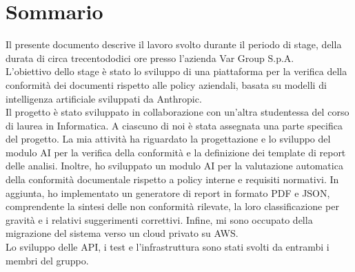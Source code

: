 \cleardoublepage
{}
{}
\begingroup
\let\clearpage\relax
\let\cleardoublepage\relax
\let\cleardoublepage\relax

\chapter*{Sommario}

Il presente documento descrive il lavoro svolto durante il periodo di stage, della durata di circa trecentododici ore presso l'azienda Var Group S.p.A. \\
L'obiettivo dello stage è stato lo sviluppo di una piattaforma per la verifica della conformità dei documenti rispetto alle policy aziendali, basata su modelli di intelligenza artificiale sviluppati da Anthropic.\\
Il progetto è stato sviluppato in collaborazione con un'altra studentessa del corso di laurea in Informatica. A ciascuno di noi è stata assegnata una parte specifica del progetto. 
La mia attività ha riguardato la progettazione e lo sviluppo del modulo AI per la verifica della conformità e la definizione dei template di report delle analisi. 
Inoltre, ho sviluppato un modulo AI per la valutazione automatica della conformità documentale rispetto a policy interne e requisiti normativi. 
In aggiunta, ho implementato un generatore di report in formato PDF e JSON, comprendente la sintesi delle non conformità rilevate, la loro classificazione per gravità e i relativi suggerimenti correttivi. 
Infine, mi sono occupato della migrazione del sistema verso un cloud privato su AWS. \\
Lo sviluppo delle API, i test e l'infrastruttura sono stati svolti da entrambi i membri del gruppo.



\endgroup

\vfill
